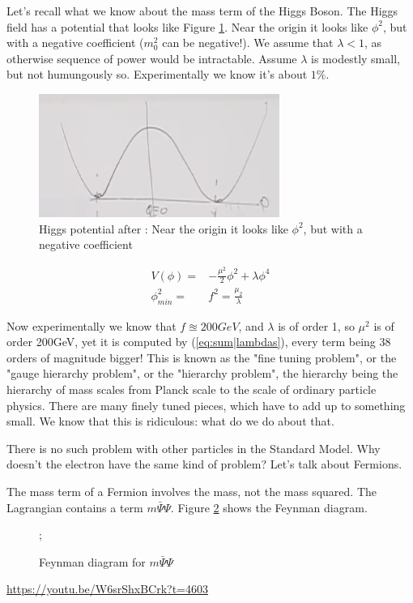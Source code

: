 \documentclass[]{article}
\begin{document}
Let's recall what we know about the mass term of the Higgs Boson. The Higgs field has a potential that looks like Figure \ref{fig:higgs-potential}. Near the origin it looks like $\phi^2$, but with a negative coefficient ($m_0^2$ can be negative!). We assume that $\lambda<1$, as otherwise sequence of power would be intractable. Assume $\lambda$ is modestly small, but not humungously so. Experimentally we know it's about $1\%$.

\begin{figure}[H]
	\caption[Higgs potential]{Higgs potential after \cite{susskind2010standard}: Near the origin it looks like $\phi^2$, but with a negative coefficient }\label{fig:higgs-potential}
	\includegraphics{higgs-potential}
\end{figure}

\begin{align*}
	V(\phi) =& - \frac{\mu^2}{2} \phi^2 + \lambda \phi^4\\
	\phi_{min}^2 =& f^2 = \frac{\mu_2}{\lambda}
\end{align*}

Now experimentally we know that $f\approxeq200GeV$, and $\lambda$ is of order 1, so $\mu^2$ is of order 200GeV, yet it is computed by (\ref{eq:sum|lambdas}), every term being 38 orders of magnitude bigger! This is known as the "fine tuning problem", or the "gauge hierarchy problem", or the "hierarchy problem", the hierarchy being the hierarchy of mass scales from Planck scale to the scale of ordinary particle physics. There are many finely tuned pieces, which have to add up to something small. We know that this is ridiculous: what do we do about that.

There is no such problem with other particles in the Standard Model. Why doesn't the electron have the same kind of problem? Let's talk about Fermions.

The mass term of a Fermion involves the mass, not the mass squared. The Lagrangian contains a term $m \bar{\Psi} \Psi$. Figure \ref{fig:Fermion:feynman} shows the Feynman diagram.

\begin{figure}[H]
	\begin{center}
		\caption{Feynman diagram for $m \bar{\Psi} \Psi$}\label{fig:Fermion:feynman}
		;
	\end{center}
\end{figure}
\url{https://youtu.be/W6srShxBCrk?t=4603}
	
\end{document}
